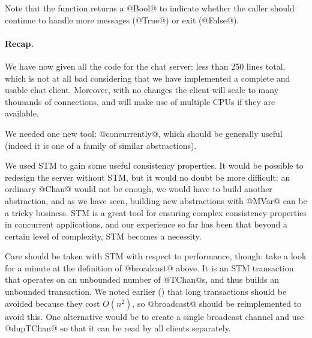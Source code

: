 
Note that the function returns a @Bool@ to indicate whether the caller
should continue to handle more messages (@True@) or exit (@False@).

\paragraph{Recap.}  We have now given all the code for the chat server: less than 250
lines total, which is not at all bad considering that we have
implemented a complete and usable chat client.  Moreover, with no
changes the client will scale to many thousands of connections, and
will make use of multiple CPUs if they are available.

We needed one new tool: @concurrently@, which should be generally
useful (indeed it is one of a family of similar abstractions).

We used STM to gain some useful consistency properties.  It would be
possible to redesign the server without STM, but it would no doubt be
more difficult: an ordinary @Chan@ would not be enough, we would have
to build another abstraction, and as we have seen, building new
abstractions with @MVar@ can be a tricky business.  STM is a great
tool for ensuring complex consistency properties in concurrent
applications, and our experience so far has been that beyond a certain
level of complexity, STM becomes a necessity.

Care should be taken with STM with respect to performance, though:
take a look for a minute at the definition of @broadcast@ above.  It
is an STM transaction that operates on an unbounded number of
@TChan@s, and thus builds an unbounded transaction.  We noted earlier
() that long transactions should be avoided because
they cost $O(n^2)$, so @broadcast@ should be reimplemented to avoid
this.  One alternative would be to create a single broadcast channel
and use @dupTChan@ so that it can be read by all clients separately.

